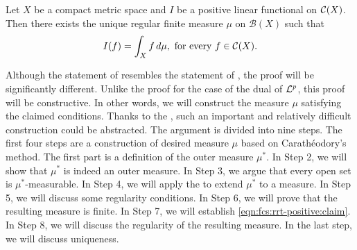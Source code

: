 \begin{theorem}
\label{thm:fcs:rrt-positive}
Let $X$ be a compact metric space and $I$ be a positive linear functional on ${\mathcal C}(X)$. Then there exists the unique regular finite measure $\mu$ on $\mathcal{B}(X)$ such that
\begin{equation}
    \label{eqn:fcs:rrt-positive:claim}
    I (f) = \int_{X} f \,d\mu, \text{    for every $f \in {\mathcal C}(X)$}.
\end{equation}
\end{theorem}
\begin{proof-idea*}
Although the statement of  resembles the statement of , the proof will be significantly different. Unlike the proof for the case of the dual of ${\mathcal {L}^p}$, this proof will be constructive. In other words, we will construct the measure $\mu$ satisfying the claimed conditions. Thanks to the , such an important and relatively difficult construction could be abstracted. The argument is divided into nine steps. The first four steps are a construction of desired measure $\mu$ based on Carathéodory's method. The first part is a definition of the outer measure $\mu^{\ast}$.  In Step 2, we will show that $\mu^{\ast}$ is indeed an outer measure. In Step 3, we argue that every open set is $\mu^{\ast}$-measurable.  In Step 4, we will apply the  to extend $\mu^{\ast}$ to a measure. In Step 5, we will discuss some regularity conditions. In Step 6, we will prove that the resulting measure is finite. In Step 7, we will establish \ref{eqn:fcs:rrt-positive:claim}. In Step 8, we will discuss the regularity of the resulting measure. In the last step, we will discuss uniqueness.
\end{proof-idea*}
